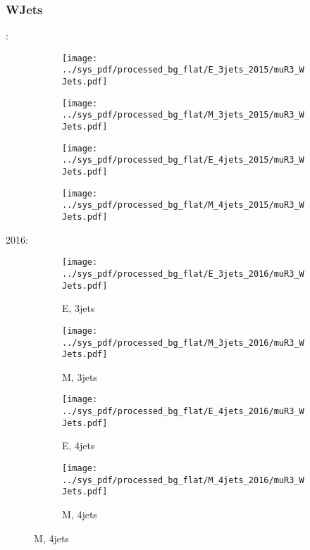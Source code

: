 \documentclass{beamer}
\begin{document}
\begin{frame}
\frametitle{WJets}
\fontsize{5}{1}:
\begin{figure}
\centering
\begin{subfigure}[b]{0.24\textwidth}
\texttt{[image: ../sys\_pdf/processed\_bg\_flat/E\_3jets\_2015/muR3\_WJets.pdf]}
\end{subfigure}
\begin{subfigure}[b]{0.24\textwidth}
\texttt{[image: ../sys\_pdf/processed\_bg\_flat/M\_3jets\_2015/muR3\_WJets.pdf]}
\end{subfigure}
\begin{subfigure}[b]{0.24\textwidth}
\texttt{[image: ../sys\_pdf/processed\_bg\_flat/E\_4jets\_2015/muR3\_WJets.pdf]}
\end{subfigure}
\begin{subfigure}[b]{0.24\textwidth}
\texttt{[image: ../sys\_pdf/processed\_bg\_flat/M\_4jets\_2015/muR3\_WJets.pdf]}
\end{subfigure}
\end{figure}
2016:
\begin{figure}
\centering
\begin{subfigure}[b]{0.24\textwidth}
\texttt{[image: ../sys\_pdf/processed\_bg\_flat/E\_3jets\_2016/muR3\_WJets.pdf]}
\captionsetup{font=tiny}
\caption{E, 3jets}
\end{subfigure}
\begin{subfigure}[b]{0.24\textwidth}
\texttt{[image: ../sys\_pdf/processed\_bg\_flat/M\_3jets\_2016/muR3\_WJets.pdf]}
\captionsetup{font=tiny}
\caption{M, 3jets}
\end{subfigure}
\begin{subfigure}[b]{0.24\textwidth}
\texttt{[image: ../sys\_pdf/processed\_bg\_flat/E\_4jets\_2016/muR3\_WJets.pdf]}
\captionsetup{font=tiny}
\caption{E, 4jets}
\end{subfigure}
\begin{subfigure}[b]{0.24\textwidth}
\texttt{[image: ../sys\_pdf/processed\_bg\_flat/M\_4jets\_2016/muR3\_WJets.pdf]}
\captionsetup{font=tiny}
\caption{M, 4jets}
\end{subfigure}
\end{figure}
\end{frame}
\end{document}
